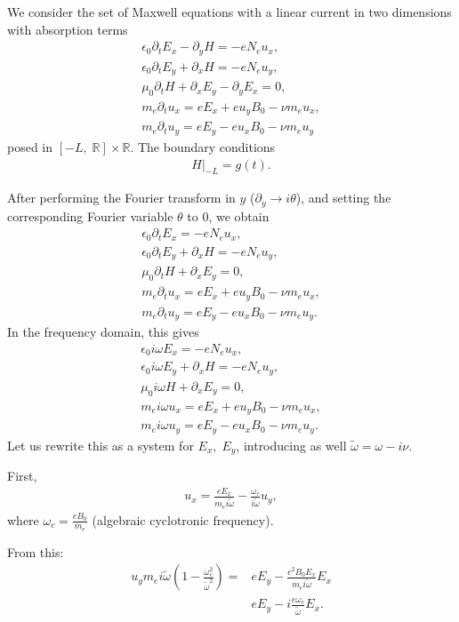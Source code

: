 \documentclass[a4paper,10pt]{article}
\begin{document}
We consider the set of Maxwell equations with a linear current in two dimensions \cite{stable_yee_plasma_current}
 with absorption terms
\begin{align*}
\epsilon_0\partial_t E_{x}-\partial_y H=-eN_e u_x,\\
\epsilon_0\partial_t E_{y}+\partial_x H=-eN_e u_y,\\
\mu_0\partial_t H+\partial_x E_y-\partial_y E_x=0,\\
m_e\partial_t u_x=eE_x+eu_yB_0-\nu m_e u_x,\\
m_e\partial_t u_y=eE_y-eu_xB_0-\nu m_e u_y
\end{align*}
posed in $[-L,\; \mathbb{R}]\times \mathbb{R}$. The boundary conditions 
\begin{align*}
 H|_{-L}=g(t).
\end{align*}

After performing the Fourier transform in $y$ ($\partial_y\rightarrow i\theta $), and setting the 
corresponding Fourier variable $\theta$ to $0$, we obtain
\begin{align*}
 \epsilon_0 \partial_t E_x=-eN_e u_x,\\
 \epsilon_0\partial_t E_y+\partial_x H=-e N_e u_y,\\
 \mu_0\partial_t H+\partial_x E_y=0,\\
m_e\partial_t u_x=eE_x+eu_yB_0-\nu m_e u_x,\\
m_e\partial_t u_y=eE_y-eu_xB_0-\nu m_e u_y.
\end{align*}
In the frequency domain, this gives 
\begin{align*}
 \epsilon_0 i\omega E_x=-e N_e u_x,\\
 \epsilon_0 i\omega E_y+\partial_x H=-e N_e u_y,\\
 \mu_0 i\omega H +\partial_x E_y=0,\\
 m_e i\omega u_x=eE_x+eu_y B_0-\nu m_e u_x,\\
  m_e i\omega u_y=eE_y-eu_x B_0-\nu m_e u_y.
\end{align*}
Let us rewrite this as a system for $E_x,\; E_y$, introducing as well $\tilde{\omega}=\omega-i\nu$.

First, 
\begin{align*}
 u_x=\frac{e E_x}{m_ei\tilde{\omega}}-\frac{\omega_c}{i\tilde{\omega}}u_y,
\end{align*}
where $\omega_c=\frac{eB_0}{m_e}$ (algebraic cyclotronic frequency). 

From this:
\begin{align*}
 u_y m_e i\tilde{\omega}\left(1-\frac{\omega_c^2}{\tilde{\omega}^2}\right)=&eE_y-\frac{e^2 B_0 E_x}{m_ei\tilde{\omega}}E_x\\
 & eE_y-i\frac{e\omega_c}{\tilde{\omega}} E_x.
\end{align*}
\end{document}

